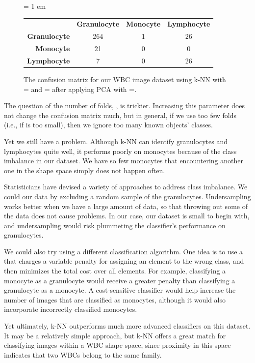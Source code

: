 \begin{figure}[h]
\centering
\tabcolsep = 1 em
\mySfFamily
{}
\begin{tabular}{r c c c}
\rowcolor{gray!50}
& \textbf{Granulocyte} & \textbf{Monocyte} & \textbf{Lymphocyte} \\
\textbf{Granulocyte} & 264 & 1 & 26 \\
\textbf{Monocyte} & \phantom{5}21 & 0 & \phantom{5}0 \\
\textbf{Lymphocyte} & \phantom{55}7 & 0 & 26
\end{tabular}
\caption{The confusion matrix for our WBC image dataset using k-NN with = and = after applying PCA with =.}
\label{fig:wbc_too_many_neighbors}
\end{figure}

The question of the number of folds, , is trickier. Increasing this parameter does not change the confusion matrix much, but in general, if we use too few folds (i.e., if  is too small), then we ignore too many known objects' classes.

Yet we still have a problem. Although k-NN can identify granulocytes and lymphocytes quite well, it performs poorly on monocytes because of the class imbalance in our dataset. We have so few monocytes that encountering another one in the shape space simply does not happen often.

Statisticians have devised a variety of approaches to address class imbalance. We could  our data by excluding a random sample of the granulocytes. Undersampling works better when we have a large amount of data, so that throwing out some of the data does not cause problems. In our case, our dataset is small to begin with, and undersampling would risk plummeting the classifier's performance on granulocytes.

We could also try using a different classification algorithm. One idea is to use a  that charges a variable penalty for assigning an element to the wrong class, and then minimizes the total cost over all elements. For example, classifying a monocyte as a granulocyte would receive a greater penalty than classifying a granulocyte as a monocyte. A cost-sensitive classifier would help increase the number of images that are classified as monocytes, although it would also incorporate incorrectly classified monocytes.

Yet ultimately, k-NN outperforms much more advanced classifiers on this dataset. It may be a relatively simple approach, but k-NN offers a great match for classifying images within a WBC shape space, since proximity in this space indicates that two WBCs belong to the same family.

